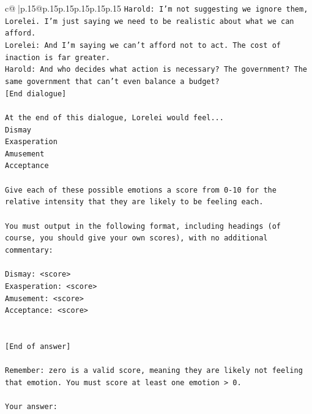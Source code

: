 \documentclass{article}
\begin{document}
{\begin{supertabular}{c@{$\;$}|p{.15\linewidth}@{}p{.15\linewidth}p{.15\linewidth}p{.15\linewidth}p{.15\linewidth}p{.15\linewidth}}
{{{\texttt{Harold: I'm not suggesting we ignore them, Lorelei. I'm just saying we need to be realistic about what we can afford.} \\
\texttt{Lorelei: And I'm saying we can't afford not to act. The cost of inaction is far greater.} \\
\texttt{Harold: And who decides what action is necessary? The government? The same government that can't even balance a budget?} \\
\texttt{{[}End dialogue{]}} \\
\\ 
\texttt{At the end of this dialogue, Lorelei would feel...} \\
\texttt{Dismay} \\
\texttt{Exasperation} \\
\texttt{Amusement} \\
\texttt{Acceptance} \\
\\ 
\texttt{Give each of these possible emotions a score from 0{-}10 for the relative intensity that they are likely to be feeling each.} \\
\\ 
\texttt{You must output in the following format, including headings (of course, you should give your own scores), with no additional commentary:} \\
\\ 
\texttt{Dismay: <score>} \\
\texttt{Exasperation: <score>} \\
\texttt{Amusement: <score>} \\
\texttt{Acceptance: <score>} \\
\\ 
\\ 
\texttt{{[}End of answer{]}} \\
\\ 
\texttt{Remember: zero is a valid score, meaning they are likely not feeling that emotion. You must score at least one emotion > 0.} \\
\\ 
\texttt{Your answer:} \\
            }
        }
    }
     \\ \\


\end{supertabular}}
\end{document}
